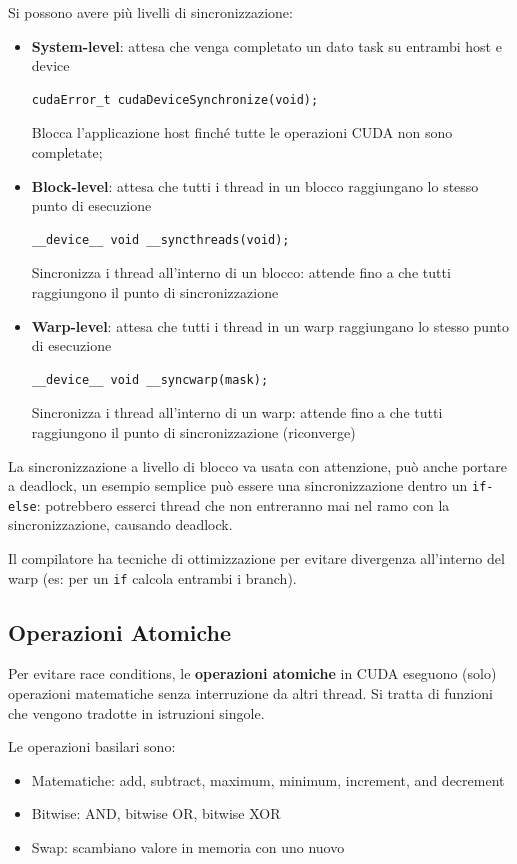 Si possono avere più livelli di sincronizzazione:
\begin{itemize}
	\item \textbf{System-level}: attesa che venga completato un dato task su entrambi host e device
	\begin{verbatim}
cudaError_t cudaDeviceSynchronize(void);
	\end{verbatim}
	Blocca l'applicazione host finché tutte le operazioni CUDA non sono completate;
	
	\item \textbf{Block-level}: attesa che tutti i thread in un blocco raggiungano lo stesso punto di esecuzione
	\begin{verbatim}
__device__ void __syncthreads(void);
	\end{verbatim}
	Sincronizza i thread all'interno di un blocco: attende fino a che tutti raggiungono il punto di sincronizzazione
	
	\item \textbf{Warp-level}: attesa che tutti i thread in un warp raggiungano lo stesso punto di esecuzione
	\begin{verbatim}
__device__ void __syncwarp(mask);
	\end{verbatim}
	Sincronizza i thread all'interno di un warp: attende fino a che tutti raggiungono il punto di sincronizzazione (riconverge)
\end{itemize}

La sincronizzazione a livello di blocco va usata con attenzione, può anche portare a deadlock, un esempio semplice può essere una sincronizzazione dentro un \texttt{if-else}: potrebbero esserci thread che non entreranno mai nel ramo con la sincronizzazione, causando deadlock.

Il compilatore ha tecniche di ottimizzazione per evitare divergenza all'interno del warp (es: per un \texttt{if} calcola entrambi i branch).


\newpage

\subsection{Operazioni Atomiche}

Per evitare race conditions, le \textbf{operazioni atomiche} in CUDA eseguono (solo) operazioni matematiche senza interruzione da altri thread. Si tratta di funzioni che vengono tradotte in istruzioni singole.

Le operazioni basilari sono:
\begin{itemize}
	\item Matematiche: add, subtract, maximum, minimum, increment, and decrement
	
	\item Bitwise: AND, bitwise OR, bitwise XOR
	
	\item Swap: scambiano valore in memoria con uno nuovo
\end{itemize}

